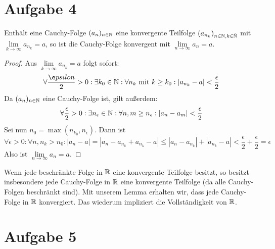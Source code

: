 \documentclass{article}
\begin{document}
	\section*{Aufgabe 4}
	\begin{lemma}
		Enthält eine Cauchy-Folge $(a_n)_{n\in \mathbb{N}}$ eine konvergente Teilfolge $(a_{n_k})_{n\in \mathbb{N}, k \in \tilde{\mathbb{N}}}$ mit $\lim\limits_{k \to \infty} a_{n_k} = a$, so ist die Cauchy-Folge konvergent mit $\lim\limits_{n \to \infty} a_n = a$.
	\end{lemma}
	\begin{proof}
		Aus $\lim\limits_{k \to \infty} a_{n_k} = a$ folgt sofort:
		\[\forall \frac{\e	psilon}{2} > 0: \exists k_0\in \N: \forall n_k \text{ mit } k\geq k_0: |a_{n_k} - a| < \frac{\epsilon}{2}\]
		Da $(a_n)_{n\in \mathbb{N}}$ eine Cauchy-Folge ist, gilt außerdem:
		\[\forall \frac{\epsilon}{2} > 0: \exists n_\epsilon\in \mathbb{N}: \forall n, m\geq n_\epsilon: |a_n-a_m|<\frac{\epsilon}{2}\]
		Sei nun $n_0 = \max(n_{k_0}, n_\epsilon)$. Dann ist
		\[\forall \epsilon > 0: \forall n, n_k > n_0: |a_n - a| = |a_n - a_{n_k} + a_{n_k} -a| \leq |a_n - a_{n_k}| + |a_{n_k} -a| < \frac{\epsilon}{2} + \frac{\epsilon}{2} = \epsilon\]
		Also ist $\lim\limits_{n \to \infty} a_n = a$.
	\end{proof}
	\noindent Wenn jede beschränkte Folge in $\mathbb{R}$ eine konvergente Teilfolge besitzt, so besitzt insbesondere jede Cauchy-Folge in $\mathbb{R}$ eine konvergente Teilfolge (da alle Cauchy-Folgen beschränkt sind). Mit unserem Lemma erhalten wir, dass jede Cauchy-Folge in $\mathbb{R}$ konvergiert. Das wiederum impliziert die Vollständigkeit von $\mathbb{R}$.
	\section*{Aufgabe 5}
	
\end{document}
